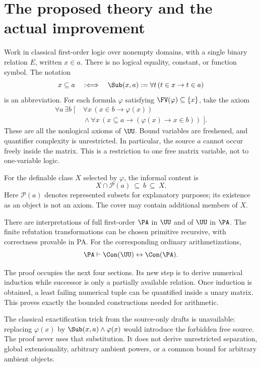 \section{The proposed theory and the actual improvement}
\label{sec:proposal}

Work in classical first-order logic over nonempty domains, with a single binary relation $E$, written $x\in a$. There is no logical equality, constant, or function symbol. The notation
\[
 x\subseteq a\quad:\Longleftrightarrow\quad
 \Sub(x,a):=\forall t\,(t\in x\to t\in a)
\]
is an abbreviation. For each formula $\varphi$ satisfying
\(\FV(\varphi)\subseteq\{x\}\), take the axiom
\begin{equation}\label{eq:unary}\tag{U}
\boxed{\begin{aligned}
 \forall a\,\exists b\;[\;&\forall x\,(x\in b\to\varphi(x))\\
 &{}\land\forall x\,(x\subseteq a\to(\varphi(x)\to x\in b))\;].
\end{aligned}}
\end{equation}
These are all the nonlogical axioms of $\UU$. Bound variables are freshened, and quantifier complexity is unrestricted. In particular, the source $a$ cannot occur freely inside the matrix. This is a restriction to one free matrix variable, not to one-variable logic.

For the definable class $X$ selected by $\varphi$, the informal content is
\[
                X\cap\mathcal P(a)\ \subseteq\ b\ \subseteq\ X.
\]
Here $\mathcal P(a)$ denotes represented subsets for explanatory purposes; its existence as an object is not an axiom. The cover may contain additional members of $X$.

\begin{theorem}\label{thm:main}
There are interpretations of full first-order $\PA$ in $\UU$ and of $\UU$ in $\PA$. The finite refutation transformations can be chosen primitive recursive, with correctness provable in PA. For the corresponding ordinary arithmetizations,
\[
                   \PA\vdash\Con(\UU)\leftrightarrow\Con(\PA).
\]
\end{theorem}

The proof occupies the next four sections. Its new step is to derive numerical induction while successor is only a partially available relation. Once induction is obtained, a least failing numerical tuple can be quantified inside a unary matrix. This proves exactly the bounded constructions needed for arithmetic.

The classical exactification trick from the source-only drafts is unavailable: replacing $\varphi(x)$ by $\Sub(x,a)\land\varphi(x)$ would introduce the forbidden free source. The proof never uses that substitution. It does not derive unrestricted separation, global extensionality, arbitrary ambient powers, or a common bound for arbitrary ambient objects.

